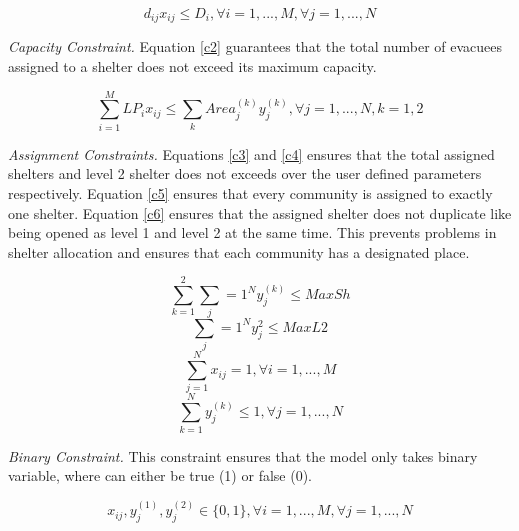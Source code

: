 \documentclass[11pt,letterpaper,]{article}
\begin{document}
	\begin{equation} 	
		\label{c1}
		d_{ij}x_{ij} \le D_{i}, \forall i = 1,..., M,  \forall j = 1,..., N 
	\end{equation}
	
	\textit{Capacity Constraint.} Equation \ref{c2} guarantees that the total number of evacuees assigned to a shelter does not exceed its maximum capacity. 
	
	\begin{equation} 
		\label{c2}
		\sum_{i=1}^{M}LP_{i}x_{ij} \le \sum_{k} Area_{j}^{(k)} y_{j}^{(k)}, \forall j = 1,..., N , k=1,2
	\end{equation}
	
	\textit{Assignment Constraints.} Equations \ref{c3} and \ref{c4} ensures that the total assigned shelters and level 2 shelter does not exceeds over the user defined parameters respectively.  Equation \ref{c5} ensures that every community is assigned to exactly one shelter. Equation \ref{c6} ensures that the assigned shelter does not duplicate like being opened as level 1 and level 2 at the same time. This prevents problems in shelter allocation and ensures that each community has a designated place.
	
	\begin{equation} 
		\label{c3}
		\sum_{k=1}^{2} \sum_j={1}^{N}y_{j}^{(k)} \le MaxSh
	\end{equation}
	\begin{equation}
		\label{c4} 
		\sum_j={1}^{N}y_{j}^2 \le MaxL2
	\end{equation}
	\begin{equation}
		\label{c5}
		\sum_{j=1}^{N}x_{ij} = 1, \forall i=1,...,M
	\end{equation}
	\begin{equation}
		\label{c6}
		\sum_{k=1}^{N}y_{j}^{(k)} \le 1, \forall j=1,...,N
	\end{equation}
	
	\textit{Binary Constraint.} This constraint ensures that the model only takes binary variable, where can either be true (1) or false (0).
	
	\begin{equation}
		\label{c7}
		x_{ij}, y_{j}^{(1)},y_{j}^{(2)} \in \{0,1\}, \forall i=1,...,M,  \forall j=1,...,N
	\end{equation}
	
\end{document}
